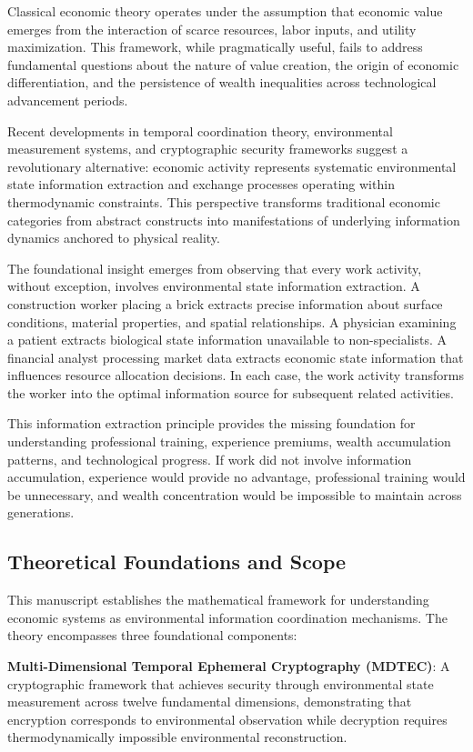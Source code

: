 \documentclass[12pt,a4paper]{article}
\begin{document}
Classical economic theory operates under the assumption that economic value emerges from the interaction of scarce resources, labor inputs, and utility maximization. This framework, while pragmatically useful, fails to address fundamental questions about the nature of value creation, the origin of economic differentiation, and the persistence of wealth inequalities across technological advancement periods.

Recent developments in temporal coordination theory, environmental measurement systems, and cryptographic security frameworks suggest a revolutionary alternative: economic activity represents systematic environmental state information extraction and exchange processes operating within thermodynamic constraints. This perspective transforms traditional economic categories from abstract constructs into manifestations of underlying information dynamics anchored to physical reality.

The foundational insight emerges from observing that every work activity, without exception, involves environmental state information extraction. A construction worker placing a brick extracts precise information about surface conditions, material properties, and spatial relationships. A physician examining a patient extracts biological state information unavailable to non-specialists. A financial analyst processing market data extracts economic state information that influences resource allocation decisions. In each case, the work activity transforms the worker into the optimal information source for subsequent related activities.

This information extraction principle provides the missing foundation for understanding professional training, experience premiums, wealth accumulation patterns, and technological progress. If work did not involve information accumulation, experience would provide no advantage, professional training would be unnecessary, and wealth concentration would be impossible to maintain across generations.

\subsection{Theoretical Foundations and Scope}

This manuscript establishes the mathematical framework for understanding economic systems as environmental information coordination mechanisms. The theory encompasses three foundational components:

\textbf{Multi-Dimensional Temporal Ephemeral Cryptography (MDTEC)}: A cryptographic framework that achieves security through environmental state measurement across twelve fundamental dimensions, demonstrating that encryption corresponds to environmental observation while decryption requires thermodynamically impossible environmental reconstruction.
\end{document}
